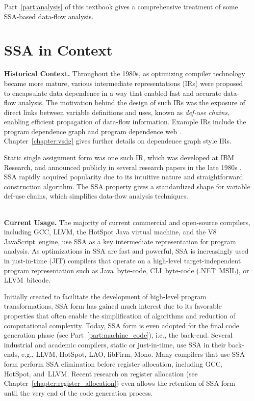Part~\ref{part:analysis} of this textbook gives a comprehensive treatment of some SSA-based data-flow analysis.




\section{SSA in Context}

\textbf{Historical Context.}
Throughout the 1980s, as optimizing compiler technology became more mature, various intermediate representations (IRs) were proposed to encapsulate data dependence in a way that enabled fast and accurate data-flow analysis. 
The motivation behind the design of such IRs was the exposure of direct links between variable definitions and uses, known as \textit{def-use chains}, enabling efficient propagation of data-flow information. 
Example IRs include the program dependence graph \cite{ferrante87program} and program dependence web \cite{ottenstein90program}. 
Chapter~\ref{chapter:vsdg} gives further details on dependence graph style IRs.

Static single assignment form was one such IR, which was developed at IBM Research, and announced publicly in several research papers in the late 1980s \cite{rosen88global,alpern88detecting,cytron89efficient}. 
SSA rapidly acquired popularity due to its intuitive nature and straightforward construction algorithm. 
The SSA property gives a standardized shape for variable def-use chains, which simplifies data-flow analysis techniques.

~\\ \textbf{Current Usage.}
The majority of current commercial and open-source compilers, including GCC, LLVM, the HotSpot Java virtual machine, and the V8 JavaScript~engine, use SSA as a key intermediate representation for program analysis. 
As optimizations in SSA are fast and powerful, SSA is increasingly used in just-in-time (JIT) compilers that operate on a high-level target-independent program representation such as Java~byte-code, CLI~byte-code (.NET~MSIL), or LLVM~bitcode.



Initially created to facilitate the development of high-level program transformations, SSA form has gained much interest due to its favorable properties that often enable the simplification of algorithms and reduction of computational complexity. 
Today, SSA form is even adopted for the final code generation phase (see Part~\ref{part:machine_code}), i.e., the back-end. 
Several industrial and academic compilers, static or just-in-time, use SSA in their back-ends, e.g., LLVM, HotSpot, LAO, libFirm, Mono. 
Many compilers that use SSA form perform SSA elimination before register allocation, including GCC, HotSpot, and~LLVM. 
Recent research on register allocation (see Chapter~\ref{chapter:register_allocation}) even allows the retention of SSA form until the very end of the code generation process.

